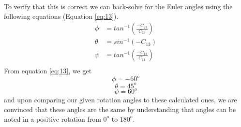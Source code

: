 \documentclass[12pt,letterpaper, onecolumn]{exam}
\begin{document}
\begin{questions}
{    To verify that this is correct we can back-solve for the Euler angles using the following equations (Equation \ref{eq:13}).
    \begin{equation}
        \begin{split}
            \phi & = tan^{-1}\left(\frac{-C_{23}}{C_{33}}\right) \\
            \theta & = sin^{-1}(-C_{13})\\
            \psi & = tan^{-1}\left(\frac{-C_{12}}{C_{11}}\right)\\
        \end{split}
        \label{eq:13}
    \end{equation}
    From equation \ref{eq:13}, we get
    \[\phi = -60^o \]
    \[\theta = 45^o \]
    \[\psi = 60^o \]
    and upon comparing our given rotation angles to these calculated ones, we are convinced that these angles are the same by understanding that angles can be noted in a positive rotation from $0^o$ to $180^o$.
    }
    \clearpage
\end{questions}
\end{document}
